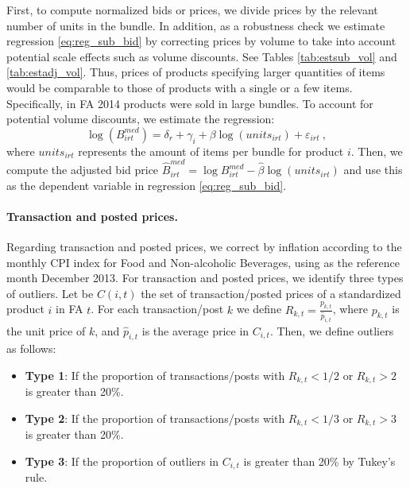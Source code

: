 First, to compute normalized bids or prices, we divide prices by the relevant number of units in the bundle.
In addition, as a robustness check we estimate regression \eqref{eq:reg_sub_bid} by correcting prices by volume to take into account potential scale effects such as volume discounts. See Tables \ref{tab:estsub_vol} and \ref{tab:estadj_vol}. Thus, prices of products specifying larger quantities of items would be comparable to those of products with a single or a few items. Specifically, in FA 2014 products were sold in large bundles. To account for potential volume discounts, we estimate 
 the regression: 
\begin{equation}
    \log (B^{med}_{irt}) = \delta_r + \gamma_i + \beta \log(units_{irt}) + \varepsilon_{irt} \ ,
    \label{eq:reg_sub_bid_rob}
\end{equation}
where $units_{irt}$ represents the amount of items per bundle for product $i$. Then, we compute the adjusted bid price  $\hat{B}^{med}_{irt} = \log B^{med}_{irt} - \hat{\beta}\log(units_{irt})$ and use this as the dependent variable in regression \eqref{eq:reg_sub_bid}.

\paragraph{Transaction and posted prices.} Regarding transaction and posted prices, we correct by inflation according to the monthly CPI index for Food and Non-alcoholic Beverages, using as the reference month December 2013. For transaction and posted prices, we identify three types of outliers. Let be $C(i,t)$ the set of transaction/posted prices of a standardized product $i$ in FA $t$. For each transaction/post $k$ we define $R_{k,t} = \frac{p_{k,t}}{\hat{p}_{i,t}}$, where $p_{k,t}$ is the unit price of $k$, and $\hat{p}_{i,t}$ is the average price in $C_{i,t}$. Then, we define outliers as follows:

\begin{itemize}
\item[] \textbf{Type 1}: If the proportion of transactions/posts with $R_{k,t}<1/2$ or $R_{k,t}>2$ is greater than 20\%.
\item[] \textbf{Type 2}: If the proportion of transactions/posts with $R_{k,t}<1/3$ or $R_{k,t}>3$ is greater than 20\%.
\item[] \textbf{Type 3}: If the proportion of outliers in $C_{i,t}$ is greater than 20\% by Tukey's rule.
\end{itemize}

